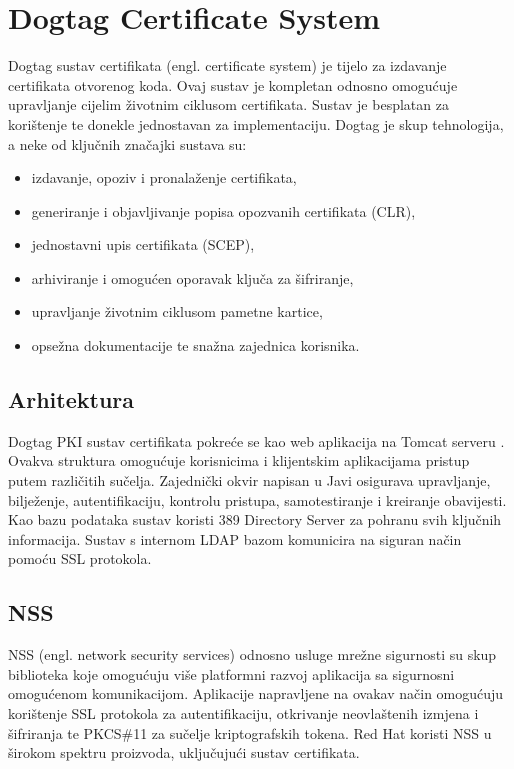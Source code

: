 \documentclass[]{foi}
\begin{document}
\pagebreak

\section{Dogtag Certificate System}

Dogtag sustav certifikata (engl. certificate system) \cite{dogtagpki} je tijelo za izdavanje certifikata otvorenog koda.
Ovaj sustav je kompletan odnosno omogućuje upravljanje cijelim životnim ciklusom certifikata.
Sustav je besplatan za korištenje te donekle jednostavan za implementaciju.
Dogtag je skup tehnologija, a neke od ključnih značajki sustava su:

\begin{itemize}[noitemsep,topsep=0pt]
    \item izdavanje, opoziv i pronalaženje certifikata,
    \item generiranje i objavljivanje popisa opozvanih certifikata (CLR),
    \item jednostavni upis certifikata (SCEP),
    \item arhiviranje i omogućen oporavak ključa za šifriranje,
    \item upravljanje životnim ciklusom pametne kartice,
    \item opsežna dokumentacije te snažna zajednica korisnika.
\end{itemize}


\subsection{Arhitektura}

Dogtag PKI sustav certifikata pokreće se kao web aplikacija na Tomcat serveru \cite{dogtagpki-architecture}.
Ovakva struktura omogućuje korisnicima i klijentskim aplikacijama pristup putem različitih sučelja.
Zajednički okvir napisan u Javi osigurava upravljanje, bilježenje, autentifikaciju, kontrolu pristupa, samotestiranje i kreiranje obavijesti.
Kao bazu podataka sustav koristi 389 Directory Server za pohranu svih ključnih informacija.
Sustav s internom LDAP bazom komunicira na siguran način pomoću SSL protokola.
\subsection{NSS}
NSS (engl. network security services) odnosno usluge mrežne sigurnosti su skup biblioteka koje omogućuju više platformni razvoj aplikacija sa sigurnosni omogućenom komunikacijom.
Aplikacije napravljene na ovakav način omogućuju korištenje SSL protokola za autentifikaciju, otkrivanje neovlaštenih izmjena i šifriranja te PKCS\#11 za sučelje kriptografskih tokena.
Red Hat koristi NSS u širokom spektru proizvoda, uključujući sustav certifikata.
\end{document}
